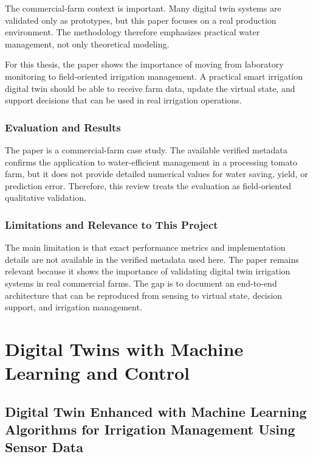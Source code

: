 The commercial-farm context is important. Many digital twin systems are validated only as prototypes, but this paper focuses on a real production environment. The methodology therefore emphasizes practical water management, not only theoretical modeling.

For this thesis, the paper shows the importance of moving from laboratory monitoring to field-oriented irrigation management. A practical smart irrigation digital twin should be able to receive farm data, update the virtual state, and support decisions that can be used in real irrigation operations.

\subsubsection{Evaluation and Results}

The paper is a commercial-farm case study. The available verified metadata confirms the application to water-efficient management in a processing tomato farm, but it does not provide detailed numerical values for water saving, yield, or prediction error. Therefore, this review treats the evaluation as field-oriented qualitative validation.

\subsubsection{Limitations and Relevance to This Project}

The main limitation is that exact performance metrics and implementation details are not available in the verified metadata used here. The paper remains relevant because it shows the importance of validating digital twin irrigation systems in real commercial farms. The gap is to document an end-to-end architecture that can be reproduced from sensing to virtual state, decision support, and irrigation management.

\section{Digital Twins with Machine Learning and Control}

\subsection[Digital Twin Enhanced with Machine Learning Algorithms for Irrigation Management Using Sensor Data]{Digital Twin Enhanced with Machine Learning Algorithms for Irrigation Management Using Sensor Data \cite{tancredi2025mldt}}

